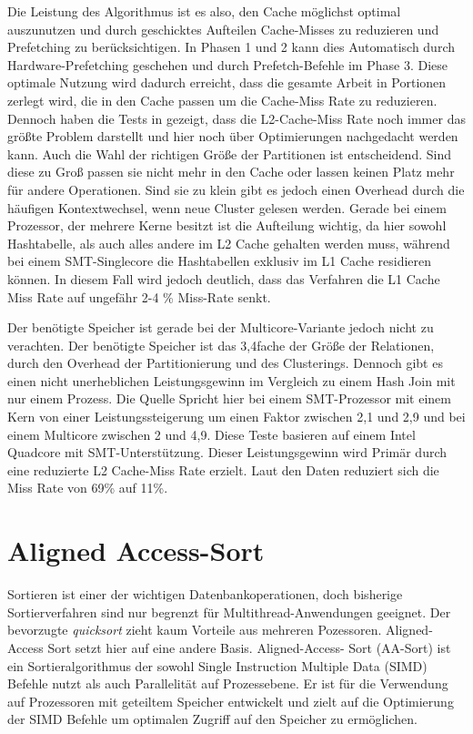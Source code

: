 Die Leistung des Algorithmus ist es also, den Cache möglichst optimal auszunutzen und durch geschicktes Aufteilen Cache-Misses zu reduzieren und Prefetching zu berücksichtigen. In Phasen 1 und 2 kann dies Automatisch durch Hardware-Prefetching geschehen und durch Prefetch-Befehle im Phase 3. Diese optimale Nutzung wird dadurch erreicht, dass die gesamte Arbeit in Portionen zerlegt wird, die in den Cache passen um die Cache-Miss Rate zu reduzieren. Dennoch haben die Tests in \cite{GARCIA} gezeigt, dass die L2-Cache-Miss Rate noch immer das größte Problem darstellt und hier noch über Optimierungen nachgedacht werden kann. Auch die Wahl der richtigen Größe der Partitionen ist entscheidend. Sind diese zu Groß passen sie nicht mehr in den Cache oder lassen keinen Platz mehr für andere Operationen. Sind sie zu klein gibt es jedoch einen Overhead durch die häufigen Kontextwechsel, wenn neue Cluster gelesen werden. Gerade bei einem Prozessor, der mehrere Kerne besitzt ist die Aufteilung wichtig, da hier sowohl Hashtabelle, als auch alles andere im L2 Cache gehalten werden muss, während bei einem SMT-Singlecore die Hashtabellen exklusiv im L1 Cache residieren können. In diesem Fall wird jedoch deutlich, dass das Verfahren die L1 Cache Miss Rate auf ungefähr 2-4 \% Miss-Rate senkt.

Der benötigte Speicher ist gerade bei der Multicore-Variante jedoch nicht zu verachten. Der benötigte Speicher ist das 3,4fache der Größe der Relationen, durch den Overhead der Partitionierung und des Clusterings. Dennoch gibt es einen nicht unerheblichen Leistungsgewinn im Vergleich zu einem Hash Join mit nur einem Prozess. Die Quelle Spricht hier bei einem SMT-Prozessor mit einem Kern von einer Leistungssteigerung um einen Faktor zwischen 2,1 und 2,9 und bei einem Multicore zwischen 2 und 4,9. Diese Teste basieren auf einem Intel Quadcore mit SMT-Unterstützung. Dieser Leistungsgewinn wird Primär durch eine reduzierte L2 Cache-Miss Rate erzielt. Laut den Daten reduziert sich die Miss Rate von 69\% auf 11\%.

\section{Aligned Access-Sort}
\label{sec:Sort_2_AA-Sort}

Sortieren ist einer der wichtigen Datenbankoperationen, doch bisherige Sortierverfahren sind nur begrenzt für Multithread-Anwendungen geeignet. Der bevorzugte \textit{quicksort} zieht kaum Vorteile aus mehreren Pozessoren. Aligned-Access Sort \cite{INOUE} setzt hier auf eine andere Basis. Aligned-Access- Sort (AA-Sort) ist ein Sortieralgorithmus der sowohl Single Instruction Multiple Data (SIMD) Befehle nutzt als auch Parallelität auf Prozessebene. Er ist für die Verwendung auf Prozessoren mit geteiltem Speicher entwickelt und zielt auf die Optimierung der SIMD Befehle um optimalen Zugriff auf den Speicher zu ermöglichen.

